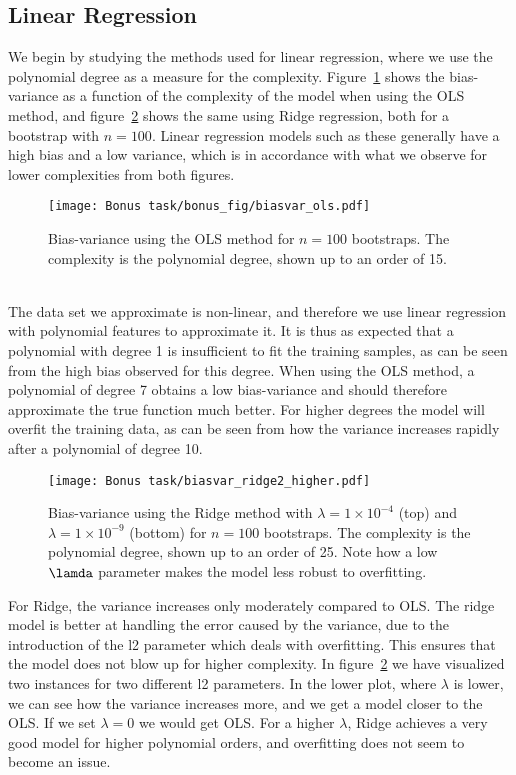 \documentclass[reprint,english,notitlepage]{revtex4-1}  %
\begin{document}
\subsection*{Linear Regression}
We begin by studying the methods used for linear regression, where we use the polynomial degree as a measure for the complexity. Figure~\ref{fig: OLS} shows the bias-variance as a function of the complexity of the model when using the OLS method, and figure~\ref{fig: ridge} shows the same using Ridge regression, both for a bootstrap with $n=100$. Linear regression models such as these generally have a high bias and a low variance, which is in accordance with what we observe for lower complexities from both figures. 
\begin{figure}[h!]
    \centering %
    \texttt{[image: Bonus task/bonus\_fig/biasvar\_ols.pdf]} 
    \caption{Bias-variance using the OLS method for $n=100$ bootstraps. The complexity is the polynomial degree, shown up to an order of 15.}
    \label{fig: OLS}
\end{figure}
\vspace{3mm}
\\
The data set we approximate is non-linear, and therefore we use linear regression with polynomial features to approximate it. It is thus as expected that a polynomial with degree 1 is insufficient to fit the training samples, as can be seen from the high bias observed for this degree. When using the OLS method, a polynomial of degree 7 obtains a low bias-variance and should therefore approximate the true function much better. For higher degrees the model will overfit the training data, as can be seen from how the variance increases rapidly after a polynomial of degree 10. 
\vspace{3mm}
\\
\begin{figure}[h!]
    \centering %
    \texttt{[image: Bonus task/biasvar\_ridge2\_higher.pdf]} 
    \caption{Bias-variance using the Ridge method with $\lambda=1\times 10^{-4}$ (top) and $\lambda=1\times 10^{-9}$ (bottom) for $n=100$ bootstraps. The complexity is the polynomial degree, shown up to an order of 25. Note how a low $\lamda$ parameter makes the model less robust to overfitting.}
    \label{fig: ridge}
\end{figure}
For Ridge, the variance increases only moderately compared to OLS. 
The ridge model is better at handling the error caused by the variance, due to the introduction of the l2 parameter which deals with overfitting. This ensures that the model does not blow up for higher complexity. 
In figure~\ref{fig: ridge} we have visualized two instances for two different l2 parameters. In the lower plot, where $\lambda$ is lower, we can see how the variance increases more, and we get a model closer to the OLS. If we set $\lambda=0$ we would get OLS. For a higher $\lambda$, Ridge achieves a very good model for higher polynomial orders, and overfitting does not seem to become an issue. 
\end{document}
